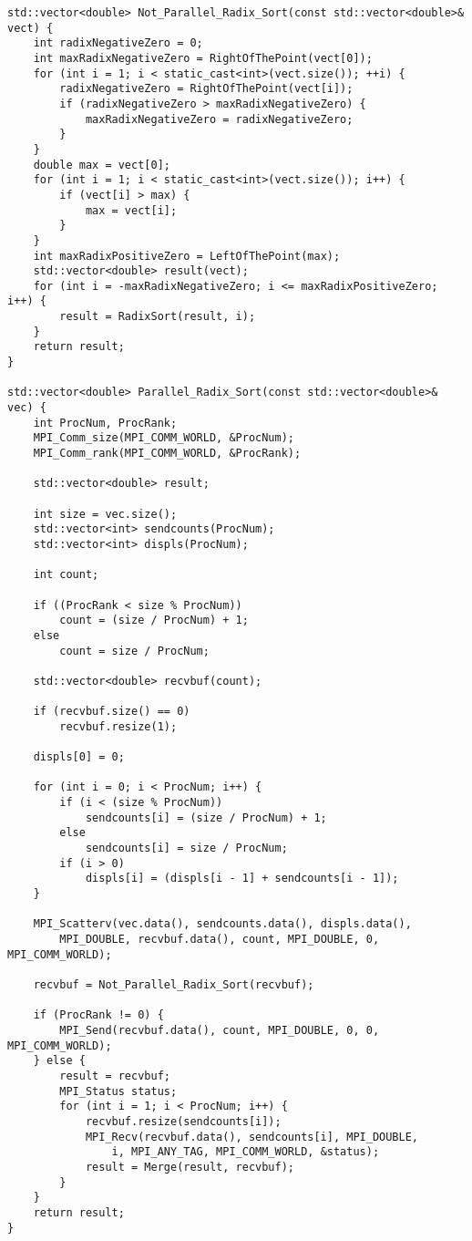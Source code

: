 \documentclass[12pt,a4paper]{article}
\begin{document}
\begin{lstlisting}
std::vector<double> Not_Parallel_Radix_Sort(const std::vector<double>& vect) {
    int radixNegativeZero = 0;
    int maxRadixNegativeZero = RightOfThePoint(vect[0]);
    for (int i = 1; i < static_cast<int>(vect.size()); ++i) {
        radixNegativeZero = RightOfThePoint(vect[i]);
        if (radixNegativeZero > maxRadixNegativeZero) {
            maxRadixNegativeZero = radixNegativeZero;
        }
    }
    double max = vect[0];
    for (int i = 1; i < static_cast<int>(vect.size()); i++) {
        if (vect[i] > max) {
            max = vect[i];
        }
    }
    int maxRadixPositiveZero = LeftOfThePoint(max);
    std::vector<double> result(vect);
    for (int i = -maxRadixNegativeZero; i <= maxRadixPositiveZero; i++) {
        result = RadixSort(result, i);
    }
    return result;
}

std::vector<double> Parallel_Radix_Sort(const std::vector<double>& vec) {
    int ProcNum, ProcRank;
    MPI_Comm_size(MPI_COMM_WORLD, &ProcNum);
    MPI_Comm_rank(MPI_COMM_WORLD, &ProcRank);

    std::vector<double> result;

    int size = vec.size();
    std::vector<int> sendcounts(ProcNum);
    std::vector<int> displs(ProcNum);

    int count;

    if ((ProcRank < size % ProcNum))
        count = (size / ProcNum) + 1;
    else
        count = size / ProcNum;

    std::vector<double> recvbuf(count);

    if (recvbuf.size() == 0)
        recvbuf.resize(1);

    displs[0] = 0;

    for (int i = 0; i < ProcNum; i++) {
        if (i < (size % ProcNum))
            sendcounts[i] = (size / ProcNum) + 1;
        else
            sendcounts[i] = size / ProcNum;
        if (i > 0)
            displs[i] = (displs[i - 1] + sendcounts[i - 1]);
    }

    MPI_Scatterv(vec.data(), sendcounts.data(), displs.data(),
        MPI_DOUBLE, recvbuf.data(), count, MPI_DOUBLE, 0, MPI_COMM_WORLD);

    recvbuf = Not_Parallel_Radix_Sort(recvbuf);

    if (ProcRank != 0) {
        MPI_Send(recvbuf.data(), count, MPI_DOUBLE, 0, 0, MPI_COMM_WORLD);
    } else {
        result = recvbuf;
        MPI_Status status;
        for (int i = 1; i < ProcNum; i++) {
            recvbuf.resize(sendcounts[i]);
            MPI_Recv(recvbuf.data(), sendcounts[i], MPI_DOUBLE,
                i, MPI_ANY_TAG, MPI_COMM_WORLD, &status);
            result = Merge(result, recvbuf);
        }
    }
    return result;
}

\end{lstlisting}
\end{document}
